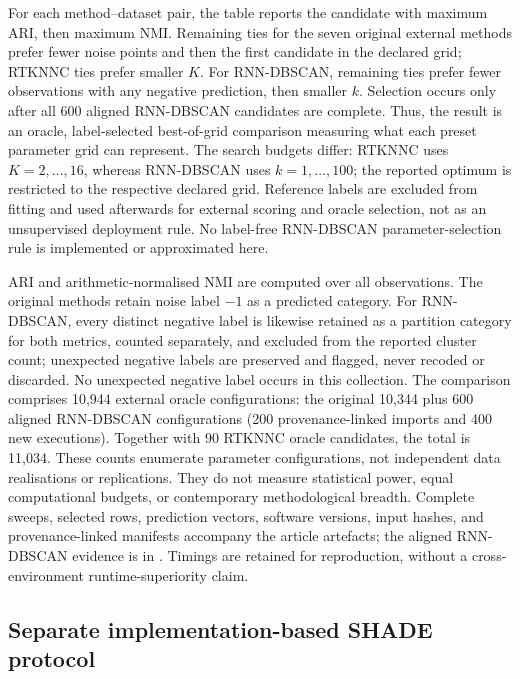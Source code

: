 \documentclass[pdflatex,sn-basic,Numbered]{sn-jnl}
\begin{document}
For each method--dataset pair, the table reports the candidate with maximum
ARI, then maximum NMI. Remaining ties for the seven original external methods
prefer fewer noise points and then the first candidate in the declared grid;
RTKNNC ties prefer smaller $K$. For RNN-DBSCAN, remaining ties prefer fewer
observations with any negative prediction, then smaller $k$. Selection occurs
only after all 600 aligned RNN-DBSCAN candidates are complete. Thus, the
result is an oracle, label-selected best-of-grid comparison measuring what
each preset parameter grid can represent. The search budgets differ:
RTKNNC uses $K=2,\ldots,16$, whereas RNN-DBSCAN uses $k=1,\ldots,100$;
the reported optimum is restricted to the respective declared grid.
Reference labels are excluded from fitting and used afterwards for external
scoring and oracle selection, not as an unsupervised deployment rule. No
label-free RNN-DBSCAN parameter-selection rule is implemented or
approximated here.

ARI and arithmetic-normalised NMI are computed over all observations. The
original methods retain noise label $-1$ as a predicted category. For
RNN-DBSCAN, every distinct negative label is likewise retained as a partition
category for both metrics, counted separately, and excluded from the reported
cluster count; unexpected negative labels are preserved and flagged, never
recoded or discarded. No unexpected negative label occurs in this collection.
The comparison comprises 10,944 external oracle configurations: the original 10,344 plus
600 aligned RNN-DBSCAN configurations (200 provenance-linked imports and 400
new executions). Together with 90 RTKNNC oracle candidates, the total is 11,034.
These counts enumerate parameter configurations, not independent data
realisations or replications. They do not measure statistical power, equal
computational budgets, or contemporary methodological breadth.
Complete sweeps, selected rows, prediction vectors, software versions,
input hashes, and provenance-linked manifests accompany the article artefacts;
the aligned RNN-DBSCAN evidence is in
. Timings are retained for
reproduction, without a cross-environment runtime-superiority claim.

\subsection{Separate implementation-based SHADE protocol}\label{sec:shade_protocol}
\end{document}

